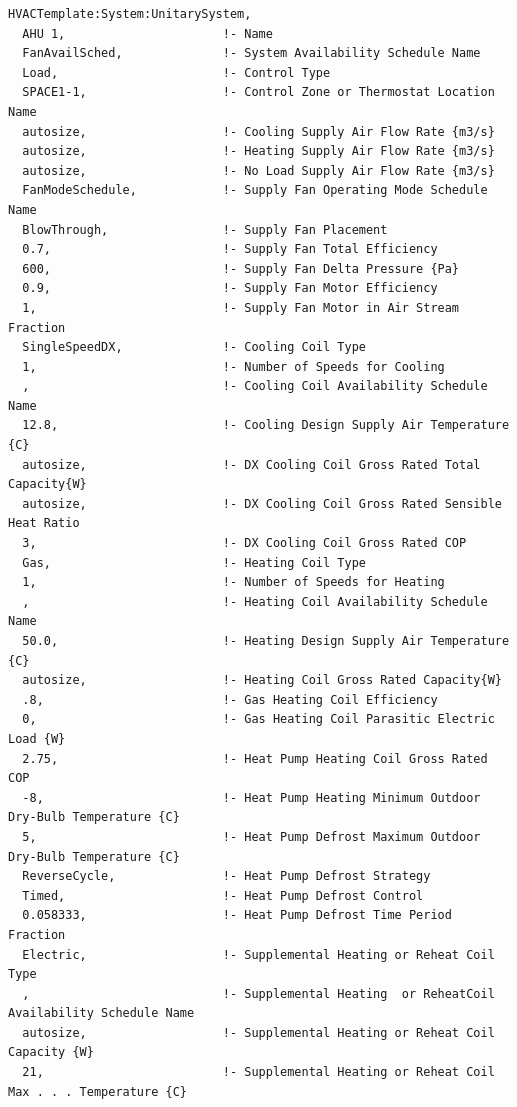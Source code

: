 \begin{lstlisting}
HVACTemplate:System:UnitarySystem,
  AHU 1,                      !- Name
  FanAvailSched,              !- System Availability Schedule Name
  Load,                       !- Control Type
  SPACE1-1,                   !- Control Zone or Thermostat Location Name
  autosize,                   !- Cooling Supply Air Flow Rate {m3/s}
  autosize,                   !- Heating Supply Air Flow Rate {m3/s}
  autosize,                   !- No Load Supply Air Flow Rate {m3/s}
  FanModeSchedule,            !- Supply Fan Operating Mode Schedule Name
  BlowThrough,                !- Supply Fan Placement
  0.7,                        !- Supply Fan Total Efficiency
  600,                        !- Supply Fan Delta Pressure {Pa}
  0.9,                        !- Supply Fan Motor Efficiency
  1,                          !- Supply Fan Motor in Air Stream Fraction
  SingleSpeedDX,              !- Cooling Coil Type
  1,                          !- Number of Speeds for Cooling
  ,                           !- Cooling Coil Availability Schedule Name
  12.8,                       !- Cooling Design Supply Air Temperature {C}
  autosize,                   !- DX Cooling Coil Gross Rated Total Capacity{W}
  autosize,                   !- DX Cooling Coil Gross Rated Sensible Heat Ratio
  3,                          !- DX Cooling Coil Gross Rated COP
  Gas,                        !- Heating Coil Type
  1,                          !- Number of Speeds for Heating
  ,                           !- Heating Coil Availability Schedule Name
  50.0,                       !- Heating Design Supply Air Temperature {C}
  autosize,                   !- Heating Coil Gross Rated Capacity{W}
  .8,                         !- Gas Heating Coil Efficiency
  0,                          !- Gas Heating Coil Parasitic Electric Load {W}
  2.75,                       !- Heat Pump Heating Coil Gross Rated COP
  -8,                         !- Heat Pump Heating Minimum Outdoor Dry-Bulb Temperature {C}
  5,                          !- Heat Pump Defrost Maximum Outdoor Dry-Bulb Temperature {C}
  ReverseCycle,               !- Heat Pump Defrost Strategy
  Timed,                      !- Heat Pump Defrost Control
  0.058333,                   !- Heat Pump Defrost Time Period Fraction
  Electric,                   !- Supplemental Heating or Reheat Coil Type
  ,                           !- Supplemental Heating  or ReheatCoil Availability Schedule Name
  autosize,                   !- Supplemental Heating or Reheat Coil Capacity {W}
  21,                         !- Supplemental Heating or Reheat Coil Max . . . Temperature {C}

\end{lstlisting}
